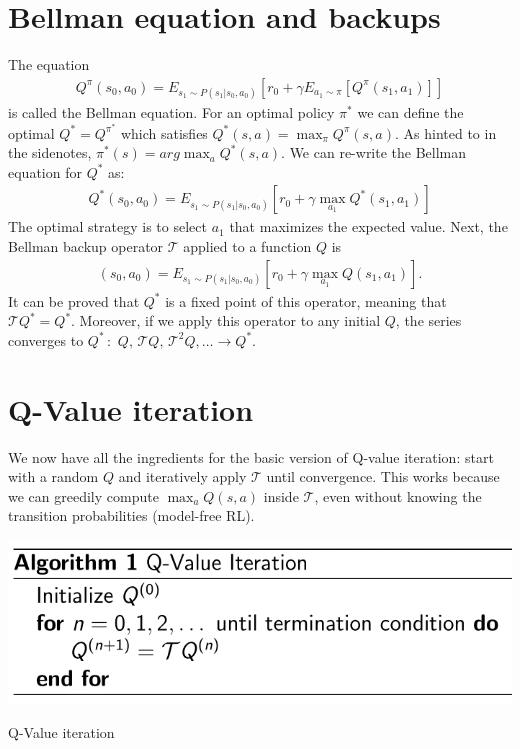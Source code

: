 \documentclass{tufte-handout}
\begin{document}
\section{Bellman equation and backups}
The equation 
\vspace{-5pt}
  \begin{align*}
  Q^\pi(s_0,a_0) = E_{s_1\sim P(s_1|s_0,a_0)} [ r_0 + \gamma E_{a_{1}\sim\pi} [Q^\pi(s_{1},a_{1})]]
  \end{align*}
is called the Bellman equation. For an optimal policy $\pi^*$ we can define the optimal $Q^* = Q^{\pi^*}$ which satisfies $Q^*(s,a) = \max_\pi Q^\pi(s,a)$. As hinted to in the sidenotes, $\pi^*(s)= arg \max_a Q^*(s,a) $. We can re-write the Bellman equation for $Q^*$ as:
\vspace{-5pt} 
  \begin{align*}
Q^*(s_0,a_0) = E_{s_1\sim P(s_1|s_0,a_0)} [ r_0 + \gamma \max_{a_{1}} Q^*(s_{1},a_{1})]
  \end{align*} 
The optimal strategy is to select $a_1$ that maximizes the expected value. Next, the Bellman backup operator $\mathcal{T}$ applied to a function $Q$ is 
\vspace{-15pt}
  \begin{align*}
  [\mathcal{T} Q](s_0,a_0) = E_{s_1\sim P(s_1|s_0,a_0)} [ r_0 + \gamma \max_{a_{1}} Q(s_{1},a_{1})].
  \end{align*} 
It can be proved that $Q^*$ is a fixed point of this operator,  meaning that $\mathcal{T} Q^* = Q^*$. Moreover, if we apply this operator to any initial $Q$, the series converges to $Q^* \,$: $\, Q,\,\mathcal{T} Q,\,\mathcal{T}^2 Q, \ldots \rightarrow Q^*$. 

\section{Q-Value iteration}
We now have all the ingredients for the basic version of Q-value iteration: start with a random $Q$ and iteratively apply $\mathcal{T}$ until convergence. This works because we can greedily compute $\max_a Q(s,a)$ inside $\mathcal{T}$, even without knowing the transition probabilities (model-free RL).
\begin{marginfigure}[-1.5cm]
  \includegraphics[width=\linewidth]{Qv}
  \caption{Q-Value iteration}
\end{marginfigure}
\end{document}
